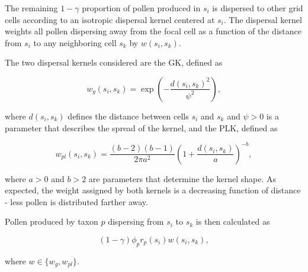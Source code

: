 \documentclass[12pt]{article}
\begin{document}
The remaining $1-\gamma$ proportion of pollen produced in $s_i$ is
dispersed to other grid cells according to an isotropic dispersal
kernel centered at $s_i$. The dispersal kernel weights all pollen
dispersing away from the focal cell as a function of the distance from
$s_i$ to any neighboring cell $s_k$ by $w(s_i, s_k)$.

The two dispersal kernels considered are the GK, defined as
\begin{linenomath*}
\begin{equation}
  w_g(s_i, s_k) = \exp\left( - \frac{d(s_i, s_k)^2}{\psi^2} \right),
\end{equation}
\end{linenomath*}
where $d(s_i,s_k)$ defines the distance between cells $s_i$ and $s_k$
and $\psi>0$ is a parameter that describes the spread of the
kernel, and the PLK, defined as
\begin{linenomath*}
\begin{equation}
w_{pl}(s_i, s_k) = \frac{(b-2)(b-1)}{2 \pi a^2} \left( 1 + \frac{d(s_i, s_k)}{a} \right)^{-b},
\end{equation}
\end{linenomath*}
where $a>0$ and $b>2$ are parameters that determine the kernel
shape. As expected, the weight assigned by both kernels is a
decreasing function of distance - less pollen is distributed farther
away.
 
Pollen produced by taxon $p$ dispersing from $s_i$ to $s_k$ is then
calculated as
\begin{linenomath*}
\begin{equation}
(1-\gamma) \phi_p r_p(s_i) w(s_i, s_k),
\end{equation}
\end{linenomath*}
where $w \in \{w_{g}, w_{pl} \}$.
\end{document}
